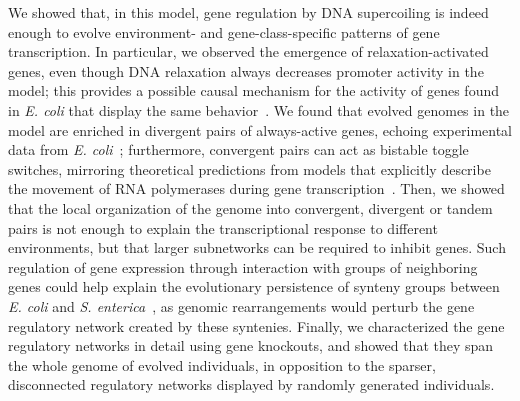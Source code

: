 We showed that, in this model, gene regulation by DNA supercoiling is indeed enough to evolve environment- and gene-class-specific patterns of gene transcription.
In particular, we observed the emergence of relaxation-activated genes, even though DNA relaxation always decreases promoter activity in the model; this provides a possible causal mechanism for the activity of genes found in \emph{E. coli} that display the same behavior~\citep{peter2004}.
We found that evolved genomes in the model are enriched in divergent pairs of always-active genes, echoing experimental data from \emph{E. coli}~\citep{sobetzko2016}; furthermore, convergent pairs can act as bistable toggle switches, mirroring theoretical predictions from models that explicitly describe the movement of RNA polymerases during gene transcription~\citep{sevier2021}.
Then, we showed that the local organization of the genome into convergent, divergent or tandem pairs is not enough to explain the transcriptional response to different environments, but that larger subnetworks can be required to inhibit genes.
Such regulation of gene expression through interaction with groups of neighboring genes could help explain the evolutionary persistence of synteny groups between \emph{E. coli} and \emph{S. enterica}~\citep{junier2016}, as genomic rearrangements would perturb the gene regulatory network created by these syntenies.
Finally, we characterized the gene regulatory networks in detail using gene knockouts, and showed that they span the whole genome of evolved individuals, in opposition to the sparser, disconnected regulatory networks displayed by randomly generated individuals.

